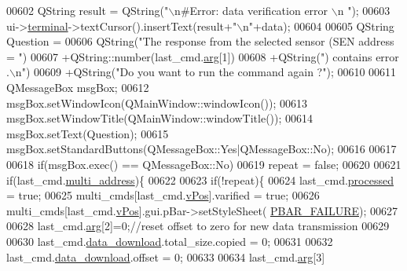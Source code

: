 \begin{DoxyCode}
{{{{{{{{{{{{{{{{{{00602              QString result =  QString(\textcolor{stringliteral}{"\(\backslash\)n#Error: data verification error \(\backslash\)n "});
00603              ui->\hyperlink{a00027_aae71c46ea4546df5994735dee573b2dd}{terminal}->textCursor().insertText(result+\textcolor{stringliteral}{"\(\backslash\)n"}+data);
00604 
00605              QString Question =
00606                      QString(\textcolor{stringliteral}{"The response from the selected sensor (SEN address = "})
00607                      +QString::number(last\_cmd.\hyperlink{a00001_a56e6c2d7315d0ae60a51e8b140c9cfe4}{arg}[1])
00608                      +QString(\textcolor{stringliteral}{") contains error .\(\backslash\)n"})
00609                      +QString(\textcolor{stringliteral}{"Do you want to run the command again ?"});
00610 
00611              QMessageBox msgBox;
00612              msgBox.setWindowIcon(QMainWindow::windowIcon());
00613              msgBox.setWindowTitle(QMainWindow::windowTitle());
00614              msgBox.setText(Question);
00615              msgBox.setStandardButtons(QMessageBox::Yes|QMessageBox::No);
00616 
00617 
00618              \textcolor{keywordflow}{if}(msgBox.exec() == QMessageBox::No)
00619                       repeat = \textcolor{keyword}{false};
00620 
00621                  \textcolor{keywordflow}{if}(last\_cmd.\hyperlink{a00001_a8e69b971c61ced27a7567efd2bf0db59}{multi\_address})\{
00622 
00623                      \textcolor{keywordflow}{if}(!repeat)\{
00624                      last\_cmd.\hyperlink{a00001_a3e88f779da9798a5da7dda227e2ca388}{processed} = \textcolor{keyword}{true};
00625                      multi\_cmds[last\_cmd.\hyperlink{a00001_a2b48b371fd84be2a8ad581b1ad708b88}{vPos}].varified = \textcolor{keyword}{true};
00626                      multi\_cmds[last\_cmd.\hyperlink{a00001_a2b48b371fd84be2a8ad581b1ad708b88}{vPos}].gui.pBar->setStyleSheet(
      \hyperlink{a00034_aa9f43b2774395af6510910f8feed7cb4}{PBAR\_FAILURE});
00627                      
00628                      last\_cmd.\hyperlink{a00001_a56e6c2d7315d0ae60a51e8b140c9cfe4}{arg}[2]=0;\textcolor{comment}{//reset offset to zero for new data transmission}
00629                        
00630                      last\_cmd.\hyperlink{a00001_a5cfeaed4d4f8e51070a324c0ba893ebe}{data\_download}.total\_size.copied       = 0;
00631                      
00632                      last\_cmd.\hyperlink{a00001_a5cfeaed4d4f8e51070a324c0ba893ebe}{data\_download}.offset                  = 0;
00633                      
00634                      last\_cmd.\hyperlink{a00001_a56e6c2d7315d0ae60a51e8b140c9cfe4}{arg}[3]              
}}}}}}}}}}}}}}}}}}
\end{DoxyCode}
